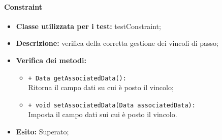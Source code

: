 \paragraph{Constraint}
\begin{flushleft}
\begin{itemize}
\item \textbf{Classe utilizzata per i test:} testConstraint;
\item \textbf{Descrizione:} verifica della corretta gestione dei vincoli di passo;
\item \textbf{Verifica dei metodi:}
\begin{sloppypar}
\begin{itemize}
\item \texttt{+ Data getAssociatedData():}\\ Ritorna il campo dati su cui è posto il vincolo;
\item \texttt{+ void setAssociatedData(Data associatedData):}\\ Imposta il campo dati sui cui è posto il vincolo.
\end{itemize}
\end{sloppypar}
\item \textbf{Esito:} Superato;
\end{itemize}
\end{flushleft}

